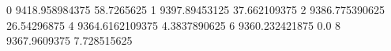 0 9418.958984375 58.7265625
1 9397.89453125 37.662109375
2 9386.775390625 26.54296875
4 9364.6162109375 4.3837890625
6 9360.232421875 0.0
8 9367.9609375 7.728515625
